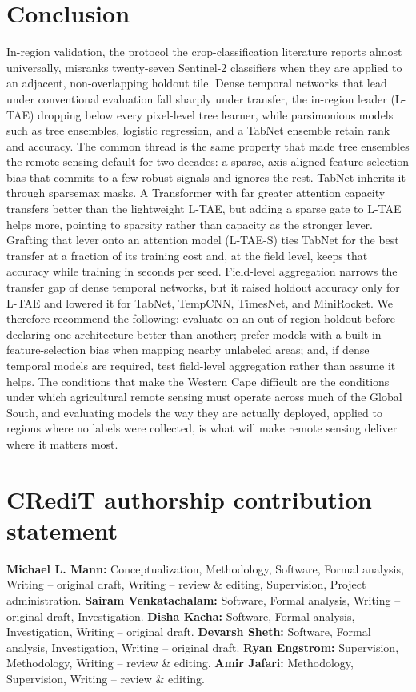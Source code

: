 \documentclass[preprint,authoryear]{elsarticle}
\begin{document}
\section{Conclusion}
In-region validation, the protocol the crop-classification literature reports almost universally, misranks twenty-seven Sentinel-2 classifiers when they are applied to an adjacent, non-overlapping holdout tile. Dense temporal networks that lead under conventional evaluation fall sharply under transfer, the in-region leader (L-TAE) dropping below every pixel-level tree learner, while parsimonious models such as tree ensembles, logistic regression, and a TabNet ensemble retain rank and accuracy. The common thread is the same property that made tree ensembles the remote-sensing default for two decades: a sparse, axis-aligned feature-selection bias that commits to a few robust signals and ignores the rest. TabNet inherits it through sparsemax masks. A Transformer with far greater attention capacity transfers better than the lightweight L-TAE, but adding a sparse gate to L-TAE helps more, pointing to sparsity rather than capacity as the stronger lever. Grafting that lever onto an attention model (L-TAE-S) ties TabNet for the best transfer at a fraction of its training cost and, at the field level, keeps that accuracy while training in seconds per seed. Field-level aggregation narrows the transfer gap of dense temporal networks, but it raised holdout accuracy only for L-TAE and lowered it for TabNet, TempCNN, TimesNet, and MiniRocket. We therefore recommend the following: evaluate on an out-of-region holdout before declaring one architecture better than another; prefer models with a built-in feature-selection bias when mapping nearby unlabeled areas; and, if dense temporal models are required, test field-level aggregation rather than assume it helps. The conditions that make the Western Cape difficult are the conditions under which agricultural remote sensing must operate across much of the Global South, and evaluating models the way they are actually deployed, applied to regions where no labels were collected, is what will make remote sensing deliver where it matters most.

\section*{CRediT authorship contribution statement}
\textbf{Michael L. Mann:} Conceptualization, Methodology, Software, Formal analysis, Writing -- original draft, Writing -- review \& editing, Supervision, Project administration.
\textbf{Sairam Venkatachalam:} Software, Formal analysis, Writing -- original draft, Investigation.
\textbf{Disha Kacha:} Software, Formal analysis, Investigation, Writing -- original draft.
\textbf{Devarsh Sheth:} Software, Formal analysis, Investigation, Writing -- original draft.
\textbf{Ryan Engstrom:} Supervision, Methodology, Writing -- review \& editing.
\textbf{Amir Jafari:} Methodology, Supervision, Writing -- review \& editing.
\end{document}
